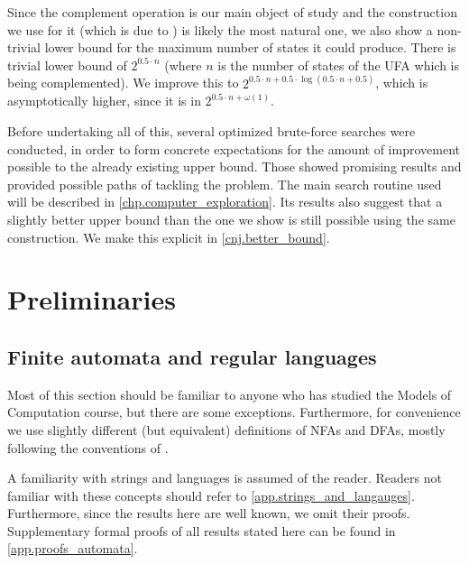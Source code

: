 \documentclass{report}
\theoremstyle{definition}
\begin{document}
Since the complement operation is our main object of study and the construction we
use for it (which is due to \cite{UFA_UB}) is likely the most natural one, we also
show a non-trivial lower bound for the maximum number of states it could produce.
There is trivial lower bound of $2^{0.5 \cdot n}$ (where $n$ is the number of states
of the UFA which is being complemented). We improve this to
$2^{0.5 \cdot n + 0.5 \cdot \log (0.5 \cdot n + 0.5)}$, which is asymptotically
higher, since it is in $2^{0.5 \cdot n + \omega (1)}$.

Before undertaking all of this, several optimized brute-force searches were conducted,
in order to form concrete expectations for the amount of improvement possible
to the already existing upper bound. Those showed promising results and provided
possible paths of tackling the problem. The main search routine used will be
described in \cref{chp.computer_exploration}. Its results also suggest that
a slightly better upper bound than the one we show is still possible
using the same construction. We make this explicit in \cref{cnj.better_bound}.

\chapter{Preliminaries}

\section{Finite automata and regular languages}
\label{sct.automata}

Most of this section should be familiar to anyone who has studied
the Models of Computation course, but there are some exceptions. Furthermore,
for convenience we use slightly different (but equivalent) definitions of NFAs
and DFAs, mostly following the conventions of \cite{UFA_UB}.

A familiarity with strings and languages is assumed of the reader. Readers not
familiar with these concepts should refer to \cref{app.strings_and_langauges}.
Furthermore, since the results here are well known, we omit their proofs.
Supplementary formal proofs of all results stated here can be found in
\cref{app.proofs_automata}.
\end{document}
